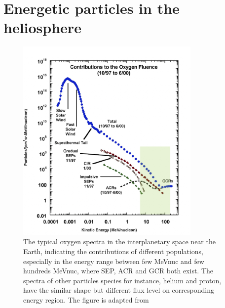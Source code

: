 \section{Energetic particles in the heliosphere}
\label{sec:particles_heliosphere}

\begin{figure}
	\centering
	\includegraphics[width = 0.8\textwidth]{images/heliospheric_particle_spectra_color.png}
	\caption[Energy spectra of oxygen ions in the near Earth space]{The typical oxygen spectra in the interplanetary space near the Earth, indicating the contributions of different populations, especially in the energy range between few MeV\/nuc and few hundreds MeV\/nuc, where \acs{SEP}, \acs{ACR} and \acs{GCR} both exist. The spectra of other particles species for instance, helium and proton, have the similar shape but different flux level on corresponding energy region. The figure is adapted from \citep{Mewaldt-2001}}
	\label{Fig:Oxygen_spectra_heliosphere}
\end{figure}


